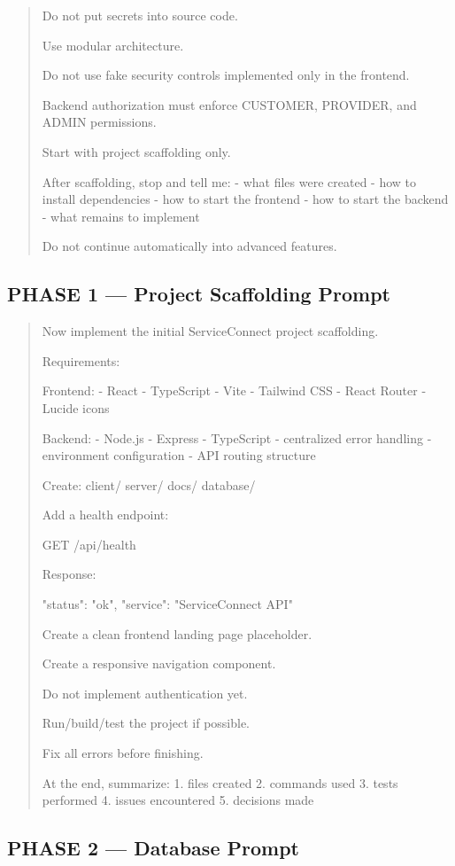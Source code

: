 \begin{quote}
Do not put secrets into source code.

Use modular architecture.

Do not use fake security controls implemented only in the frontend.

Backend authorization must enforce CUSTOMER, PROVIDER, and ADMIN permissions.

Start with project scaffolding only.

After scaffolding, stop and tell me:
- what files were created
- how to install dependencies
- how to start the frontend
- how to start the backend
- what remains to implement

Do not continue automatically into advanced features.
\end{quote}

\subsection*{PHASE 1 --- Project Scaffolding Prompt}

\begin{quote}
Now implement the initial ServiceConnect project scaffolding.

Requirements:

Frontend:
- React
- TypeScript
- Vite
- Tailwind CSS
- React Router
- Lucide icons

Backend:
- Node.js
- Express
- TypeScript
- centralized error handling
- environment configuration
- API routing structure

Create:
client/
server/
docs/
database/

Add a health endpoint:

GET /api/health

Response:

{
  "status": "ok",
  "service": "ServiceConnect API"
}

Create a clean frontend landing page placeholder.

Create a responsive navigation component.

Do not implement authentication yet.

Run/build/test the project if possible.

Fix all errors before finishing.

At the end, summarize:
1. files created
2. commands used
3. tests performed
4. issues encountered
5. decisions made
\end{quote}

\subsection*{PHASE 2 --- Database Prompt}

